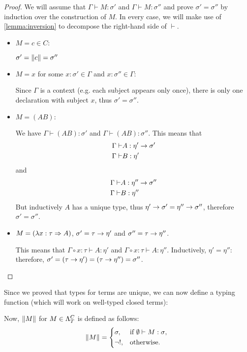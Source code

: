 \documentclass[main.tex]{subfiles}
\begin{document}
\begin{proof}
    We will assume that $\Gamma \vdash M : \sigma'$ and $\Gamma \vdash M : \sigma''$
    and prove $\sigma' = \sigma''$ by induction over the construction of $M$.
    In every case, we will make use of \cref{lemma:inversion} to decompose
    the right-hand side of $\vdash$.

    \begin{itemize}
        \item $M = c \in C$:

            $\sigma' = \typeof{c} = \sigma''$

        \item $M = x$ for some $x : \sigma' \in \Gamma$ and $x : \sigma'' \in \Gamma$:

            Since $\Gamma$ is a context (e.g. each subject appears only once),
            there is only one declaration with subject $x$, thus $\sigma' = \sigma''$.

        \item $M = (AB)$:

            We have $\Gamma \vdash (AB) : \sigma'$ and $\Gamma \vdash (AB) : \sigma''$.
            This means that
            \begin{align*}
                \Gamma \vdash& A : \eta' \tot \sigma'\\
                \Gamma \vdash& B : \eta'
            \end{align*}
            and
            \begin{align*}
                \Gamma \vdash& A : \eta'' \tot \sigma''\\
                \Gamma \vdash& B : \eta''
            \end{align*}
            But inductively $A$ has a unique type, thus $\eta' \tot \sigma'
            = \eta'' \tot \sigma''$, therefore $\sigma' = \sigma''$.

        \item $M = (\lambda x : \tau \abstr A)$, $\sigma' = \tau \tot \eta'$
            and $\sigma'' = \tau \tot \eta''$.

            This means that $\Gamma \circ x : \tau \vdash A : \eta'$ and
            $\Gamma \circ x : \tau \vdash A : \eta''$. Inductively, $\eta'
            = \eta''$: therefore, $\sigma' = (\tau \tot \eta') = (\tau \tot \eta'')
            = \sigma''$.
    \end{itemize}
\end{proof}

Since we proved that types for terms are unique, we can now define a typing
function (which will work on well-typed closed terms):
\begin{defn}
    Now, $\typeof{M}$ for $M \in \plambda{T}{C}$ is defined as follows:
    \[
        \typeof{M} =
        \begin{cases*}
            \sigma, & if $\emptyset \vdash M : \sigma$, \\
            \neg !, & otherwise.
        \end{cases*}
    \]
\end{defn}
\end{document}
